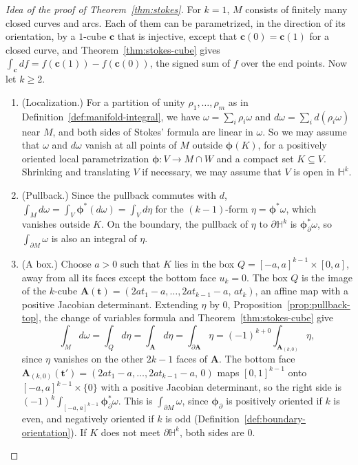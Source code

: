 \documentclass[11pt]{article}
\theoremstyle{definition}
\theoremstyle{plain}
\theoremstyle{remark}
\begin{document}
\begin{proof}[Idea of the proof of Theorem~\ref{thm:stokes}]
    For $k = 1$, $M$ consists of finitely many closed curves and arcs. Each of them can be parametrized, in the direction of its orientation, by a $1$-cube $\mathbf{c}$ that is injective, except that $\mathbf{c}(0) = \mathbf{c}(1)$ for a closed curve, and Theorem~\ref{thm:stokes-cube} gives $\int_{\mathbf{c}} df = f(\mathbf{c}(1)) - f(\mathbf{c}(0))$, the signed sum of $f$ over the end points. Now let $k \geq 2$.
    \begin{enumerate}
        \item (Localization.) For a partition of unity $\rho_1, \ldots, \rho_m$ as in Definition~\ref{def:manifold-integral}, we have $\omega = \sum_i \rho_i\omega$ and $d\omega = \sum_i d(\rho_i\omega)$ near $M$, and both sides of Stokes' formula are linear in $\omega$. So we may assume that $\omega$ and $d\omega$ vanish at all points of $M$ outside $\boldsymbol{\phi}(K)$, for a positively oriented local parametrization $\boldsymbol{\phi}: V \to M \cap W$ and a compact set $K \subseteq V$. Shrinking and translating $V$ if necessary, we may assume that $V$ is open in $\mathbb{H}^k$.
        \item (Pullback.) Since the pullback commutes with $d$, $\int_M d\omega = \int_V \boldsymbol{\phi}^*(d\omega) = \int_V d\eta$ for the $(k - 1)$-form $\eta = \boldsymbol{\phi}^*\omega$, which vanishes outside $K$. On the boundary, the pullback of $\eta$ to $\partial\mathbb{H}^k$ is $\boldsymbol{\phi}_\partial^*\omega$, so $\int_{\partial M} \omega$ is also an integral of $\eta$.
        \item (A box.) Choose $a > 0$ such that $K$ lies in the box $Q = [-a, a]^{k-1} \times [0, a]$, away from all its faces except the bottom face $u_k = 0$. The box $Q$ is the image of the $k$-cube $\mathbf{A}(\mathbf{t}) = (2at_1 - a, \ldots, 2at_{k-1} - a, \, at_k)$, an affine map with a positive Jacobian determinant. Extending $\eta$ by $0$, Proposition~\ref{prop:pullback-top}, the change of variables formula and Theorem~\ref{thm:stokes-cube} give
        \[\int_M d\omega = \int_Q d\eta = \int_{\mathbf{A}} d\eta = \int_{\partial\mathbf{A}} \eta = (-1)^{k + 0}\int_{\mathbf{A}_{(k, 0)}} \eta,\]
        since $\eta$ vanishes on the other $2k - 1$ faces of $\mathbf{A}$. The bottom face $\mathbf{A}_{(k, 0)}(\mathbf{t}') = (2at_1 - a, \ldots, 2at_{k-1} - a, \, 0)$ maps $[0, 1]^{k-1}$ onto $[-a, a]^{k-1} \times \{0\}$ with a positive Jacobian determinant, so the right side is $(-1)^k \int_{[-a, a]^{k-1}} \boldsymbol{\phi}_\partial^*\omega$. This is $\int_{\partial M} \omega$, since $\boldsymbol{\phi}_\partial$ is positively oriented if $k$ is even, and negatively oriented if $k$ is odd (Definition~\ref{def:boundary-orientation}). If $K$ does not meet $\partial\mathbb{H}^k$, both sides are $0$.

\end{enumerate}
\end{proof}
\end{document}
